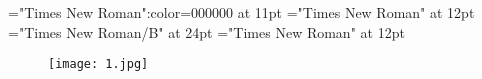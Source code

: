 \documentclass[a4paper]{article}
\begin{document}
\font\entryletDatadicBody="Times New Roman":color=000000 at 11pt
\font{}="Times New Roman" at 12pt
\font{}="Times New Roman/B" at 24pt
\font{}="Times New Roman" at 12pt
\pagestyle{fancy} 
\begin{center}
 \label{first_pageC} \end{center}
\setlength{\columnsep}{0.5em} 
\setlength\columnseprule{0.4pt} 
\begin{multicols}{2}{\raggedright} \begin{adjustwidth}{1pt}{0pt}{2pt}{9pt}
 \begin{hanglist}[36pt] \item \begin{adjustwidth}{2pt}{2pt}{2pt}{2pt}\begin{center}

\begin{wrapfigure}
\begin{center}
\texttt{[image: 1.jpg]} 
\caption{}
\end{center}
\end{wrapfigure}




\end{center}
\end{adjustwidth}
\end{hanglist}
\end{adjustwidth}
\end{multicols}
\end{document}
